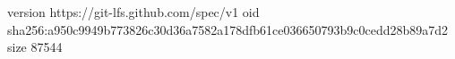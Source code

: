 version https://git-lfs.github.com/spec/v1
oid sha256:a950c9949b773826c30d36a7582a178dfb61ce036650793b9c0cedd28b89a7d2
size 87544
